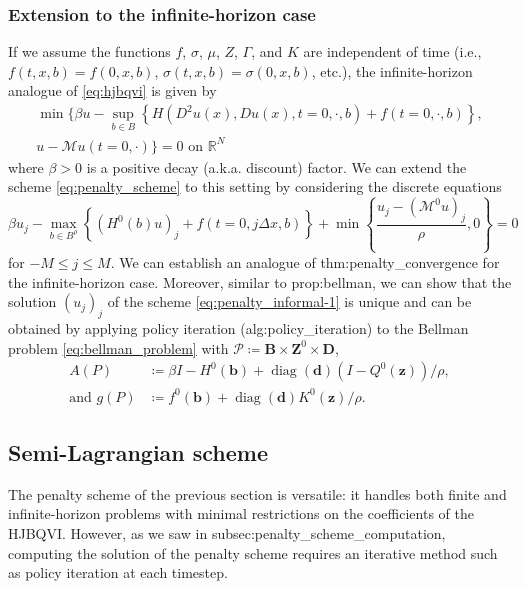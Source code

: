 \documentclass[12pt]{article}
\begin{document}
\subsubsection{Extension to the infinite-horizon case}

If we assume the functions $f$, $\sigma$, $\mu$, $Z$, $\Gamma$,
and $K$ are independent of time (i.e., $f(t,x,b)=f(0,x,b)$, $\sigma(t,x,b)=\sigma(0,x,b)$,
etc.), the infinite-horizon analogue of \eqref{eq:hjbqvi} is given
by
\begin{multline*}
\min\biggl\{ \beta u-\sup_{b\in B}\left\{ H(D^{2}u(x),Du(x),t=0,\cdot,b)+f(t=0,\cdot,b)\right\} ,\\
u-\mathcal{M}u(t=0,\cdot)\biggr\} =0\text{ on }\mathbb{R}^{N}
\end{multline*}
where $\beta>0$ is a positive decay (a.k.a. discount) factor. We
can extend the scheme \eqref{eq:penalty_scheme} to this setting by
considering the discrete equations
\begin{equation}
\beta u_{j}-\max_{b\in B^{\rho}}\left\{ (H^{0}(b)u)_{j}+f(t=0,j\Delta x,b)\right\} +\min\left\{ \frac{u_{j}-(\mathcal{M}^{0}u)_{j}}{\rho},0\right\} =0\label{eq:penalty_informal-1}
\end{equation}
for $-M{\leqslant} j{\leqslant} M$. We can establish an analogue of {\prettyref}{thm:penalty_convergence}
for the infinite-horizon case. Moreover, similar to {\prettyref}{prop:bellman},
we can show that the solution $(u_{j})_{j}$ of the scheme \eqref{eq:penalty_informal-1}
is unique and can be obtained by applying policy iteration ({\prettyref}{alg:policy_iteration})
to the Bellman problem \eqref{eq:bellman_problem} with $\mathcal{P}\coloneqq\boldsymbol{B}\times\boldsymbol{Z}^{0}\times\boldsymbol{D}$,
\begin{align*}
A(P) & \coloneqq\beta I-H^{0}(\boldsymbol{b})+{\operatorname{diag}}(\boldsymbol{d})(I-Q^{0}(\boldsymbol{z}))/\rho,\\
\text{and }g(P) & \coloneqq f^{0}(\boldsymbol{b})+{\operatorname{diag}}(\boldsymbol{d})K^{0}(\boldsymbol{z})/\rho.
\end{align*}

\subsection{Semi-Lagrangian scheme}

The penalty scheme of the previous section is versatile: it handles
both finite and infinite-horizon problems with minimal restrictions
on the coefficients of the HJBQVI. However, as we saw in {\prettyref}{subsec:penalty_scheme_computation},
computing the solution of the penalty scheme requires an iterative method such as policy iteration at each timestep.
\end{document}
